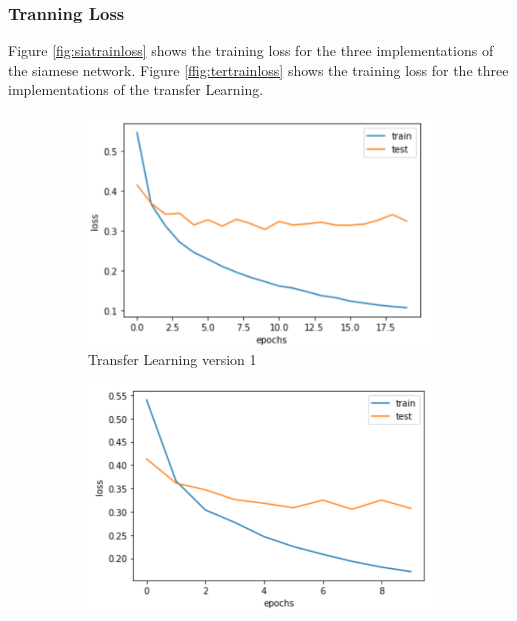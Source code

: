 \subsubsection{Tranning Loss}

Figure \ref{fig:siatrainloss} shows the training loss for the three implementations of the siamese network. Figure \ref{ffig:tertrainloss} shows the training loss for the three implementations of the transfer Learning.


\begin{figure}[h]
  \centering
  \begin{subfigure}[b]{0.48\linewidth}
  \includegraphics[width=\linewidth]{figs/transfer_loss.png}
  \caption{Transfer Learning version 1}
  \label{fig:con_loss}
  \end{subfigure}
  \hfill
   \begin{subfigure}[b]{0.48\linewidth}
   \includegraphics[width=\linewidth]{figs/transfer_loss_2.png}

\end{subfigure}
\end{figure}
